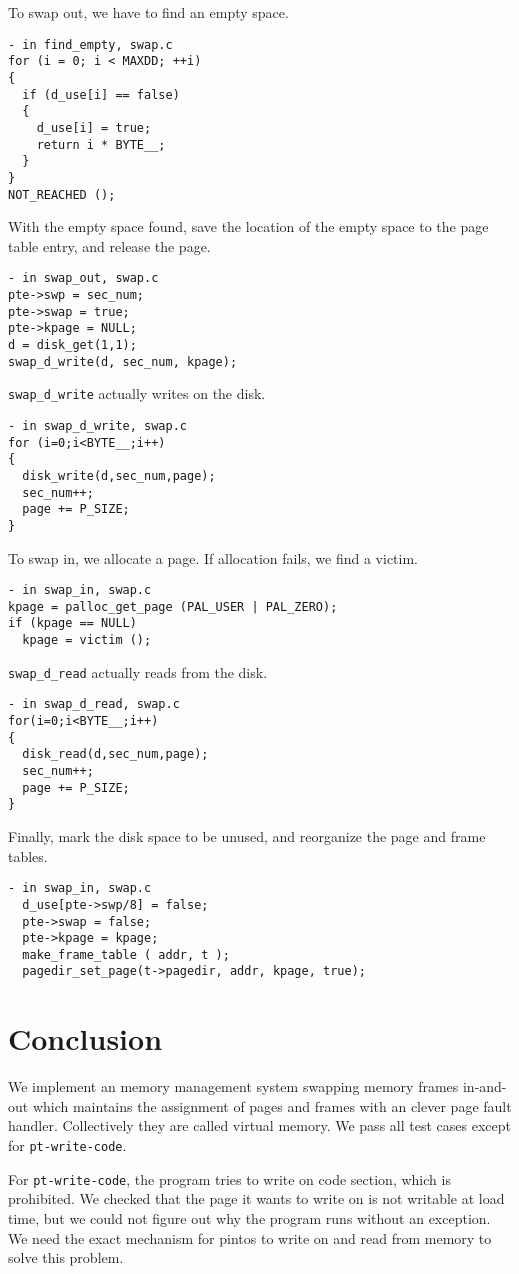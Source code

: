 \documentclass[a4paper,article,11pt,oneside]{article}
\begin{document}
To swap out, we have to find an empty space.
\begin{verbatim}
- in find_empty, swap.c
for (i = 0; i < MAXDD; ++i)
{
  if (d_use[i] == false)
  {
    d_use[i] = true;
    return i * BYTE__;
  }
}
NOT_REACHED ();
\end{verbatim}
With the empty space found, save the location of the empty space to
the page table entry, and release the page.
\begin{verbatim}
- in swap_out, swap.c
pte->swp = sec_num;
pte->swap = true;
pte->kpage = NULL;
d = disk_get(1,1);
swap_d_write(d, sec_num, kpage);
\end{verbatim}
\texttt{swap\_d\_write} actually writes on the disk.
\begin{verbatim}
- in swap_d_write, swap.c
for (i=0;i<BYTE__;i++)
{
  disk_write(d,sec_num,page);
  sec_num++;
  page += P_SIZE;
}
\end{verbatim}

To swap in, we allocate a page. If allocation fails, we find a victim.
\begin{verbatim}
- in swap_in, swap.c
kpage = palloc_get_page (PAL_USER | PAL_ZERO);
if (kpage == NULL) 
  kpage = victim ();
\end{verbatim}
\texttt{swap\_d\_read} actually reads from the disk.
\begin{verbatim}
- in swap_d_read, swap.c
for(i=0;i<BYTE__;i++)
{
  disk_read(d,sec_num,page);
  sec_num++;
  page += P_SIZE;
}
\end{verbatim}
Finally, mark the disk space to be unused, and reorganize the page and
frame tables.
\begin{verbatim}
- in swap_in, swap.c
  d_use[pte->swp/8] = false;
  pte->swap = false;
  pte->kpage = kpage;
  make_frame_table ( addr, t );
  pagedir_set_page(t->pagedir, addr, kpage, true);
\end{verbatim}

\section{Conclusion}\label{secconclusion}
We implement an memory management system swapping memory frames
in-and-out which maintains the assignment of pages and
frames with an clever page fault handler. Collectively they are called
virtual memory. We pass all test cases except for
\texttt{pt-write-code}.

For \texttt{pt-write-code}, the program tries to write on code
section, which is prohibited. We checked that the page it wants to
write on is not writable at load time, but we could not figure out why
the program runs without an exception. We need the exact mechanism for
pintos to write on and read from memory to solve this problem.
\end{document}
